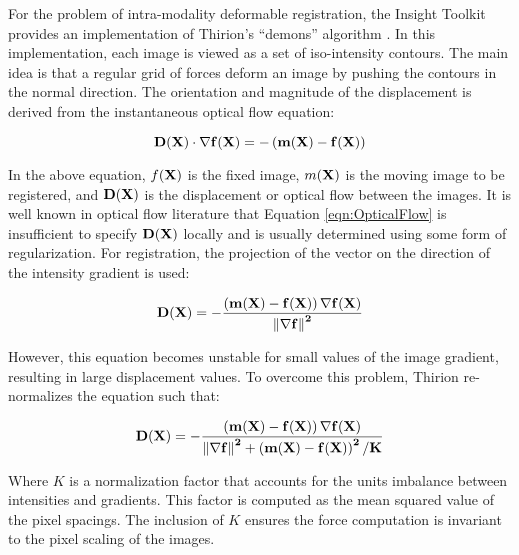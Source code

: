 %
%
%
%
%
%

For the problem of intra-modality deformable registration, the Insight
Toolkit provides an implementation of Thirion's ``demons'' algorithm
\cite{Thirion1995b,Thirion1998}.
In this implementation, each image is viewed as a set of iso-intensity
contours.  The main idea is that a regular grid of forces deform an image by
pushing the contours in the normal direction.  The orientation and magnitude
of the displacement is derived from the instantaneous optical flow equation:

\begin{equation}
\bf{D}(\bf{X}) \cdot \nabla f(\bf{X}) = - \left(m(\bf{X}) - f(\bf{X}) \right)
\label{eqn:OpticalFlow}
\end{equation}

In the above equation, $f(\bf{X})$ is the fixed image, $m(\bf{X})$
is the moving image to be registered, and $\bf{D}(\bf{X})$ is the displacement
or optical flow between the images. It is well known in optical flow
literature that Equation \ref{eqn:OpticalFlow} is insufficient to specify
$\bf{D}(\bf{X})$ locally and is usually determined using some form of
regularization. For registration, the projection of the vector on the
direction of the intensity gradient is used:

\begin{equation}
\bf{D}(\bf{X}) = - \frac
{\left(  m(\bf{X}) - f(\bf{X}) \right) \nabla f(\bf{X})}
{\left\|  \nabla f \right\|^2 }
\end{equation}

However, this equation becomes unstable for small values of the image gradient,
resulting in large displacement values. To overcome this problem, Thirion
re-normalizes the equation such that:

\begin{equation}
\bf{D}(\bf{X}) = - \frac
{\left(  m(\bf{X}) - f(\bf{X}) \right) \nabla f(\bf{X})}
{\left\|  \nabla f \right\|^2 + \left(  m(\bf{X}) - f(\bf{X}) \right)^2 / K }
\label{eqn:DemonsDisplacement}
\end{equation}

Where $K$ is a normalization factor that accounts for the units imbalance
between intensities and gradients. This factor is computed as the mean squared
value of the pixel spacings. The inclusion of $K$ ensures the force computation is
invariant to the pixel scaling of the images.

